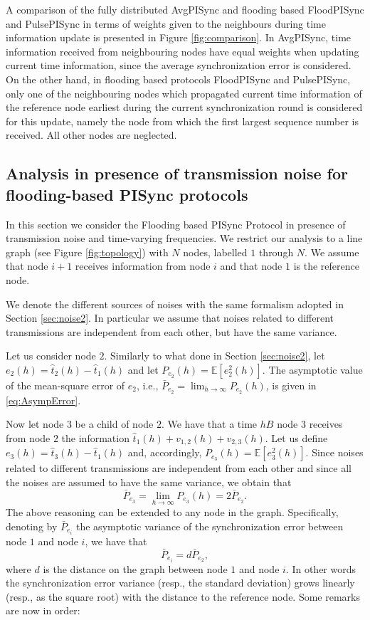 \documentclass[english,a4paper,10pt,final]{article}
\numberwithin{equation}{section}
\numberwithin{figure}{section}
\begin{document}
A comparison of the fully distributed AvgPISync and flooding based FloodPISync and PulsePISync in terms of weights given to the neighbours during time information update is presented in Figure \ref{fig:comparison}. In AvgPISync, time information received from neighbouring nodes have equal weights when updating current time information, since the average synchronization error is considered. On the other hand, in flooding based protocols FloodPISync and PulsePISync, only one of the neighbouring nodes which propagated current time information of the reference node earliest during the current synchronization round is considered for this update, namely the node from which the first largest sequence number is received. All other nodes are neglected. 

\subsection{Analysis in presence of transmission noise for flooding-based PISync protocols}
\label{sec:noise}

In this section we consider the Flooding based PISync Protocol in presence of transmission noise and time-varying frequencies. We restrict our analysis to a line graph (see Figure \ref{fig:topology}) with $N$ nodes, labelled $1$ through $N$. We assume that node $i+1$ receives information from node $i$ and that node $1$ is the reference node.

We denote the different sources of noises with the same formalism adopted in Section \ref{sec:noise2}. In particular we assume that noises related to different transmissions are independent from each other, but have the same variance. 

Let us consider node $2$. Similarly to what done in Section \ref{sec:noise2}, let $e_2(h)=\hat{t}_2(h)-\hat{t}_1(h)$ and let $P_{e_2}(h)=\mathbb{E} \left[e^2_2(h)\right]$. The asymptotic value of the mean-square error of $e_2$, i.e., $\bar{P}_{e_2}=\lim_{h \to \infty} P_{e_2}(h)$, is given in \eqref{eq:AsympError}.

Now let node $3$ be a child of node $2$. We have that a time $hB$ node $3$ receives from node $2$ the information $\hat{t}_1(h)+v_{1,2}(h)+v_{2,3}(h)$. Let us define $e_{3}(h)=\hat{t}_3(h)- \hat{t}_1(h)$ and, accordingly, $P_{e_{3}}(h)= \mathbb{E}\left[e_{3}^2(h)\right]$. Since 
noises related to different transmissions are independent from each other and since all the noises are assumed to have the same variance, we obtain that
$$
\bar{P}_{e_3}=\lim_{h \to \infty} P_{e_3}(h)=2\bar{P}_{e_2}.
$$
The above reasoning can be extended to any node in the graph. Specifically, denoting by $\bar{P}_{e_i}$ the asymptotic variance of the synchronization error between node $1$ and node $i$, we have that
$$
\bar{P}_{e_i}=d\bar{P}_{e_2},
$$
where $d$ is the distance on the graph between node $1$ and node $i$. In other words the synchronization error variance (resp., the standard deviation) grows linearly (resp., as the square root) with the distance to the reference node.
Some remarks are now in order:
\end{document}
